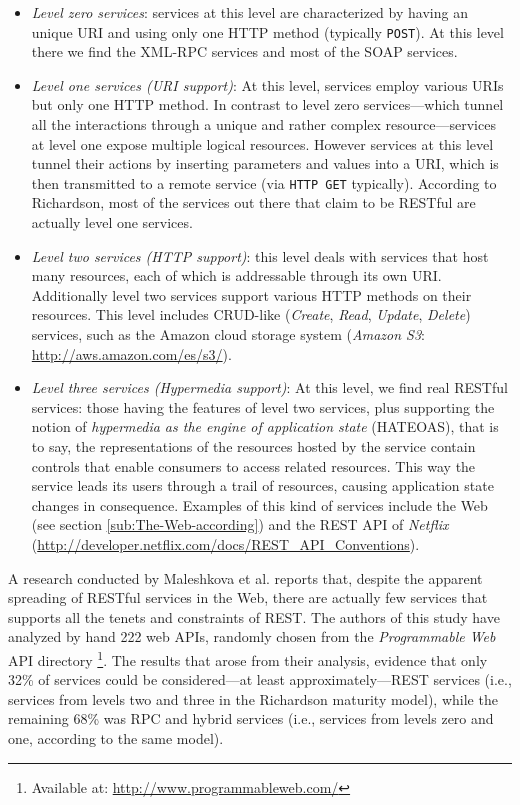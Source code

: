\begin{itemize}
\item \emph{Level zero services}: services at this level are characterized by having an unique URI and using only one HTTP method (typically \texttt{POST}). At this level there we find the XML-RPC services \cite{Laurent:2001} and most of the SOAP services. 
\item \emph{Level one services (URI support)}: At this level, services employ various URIs but only one HTTP method. In contrast to level zero services---which tunnel all the interactions through a unique and rather complex resource---services at level one expose multiple logical resources. However services at this level tunnel their actions by inserting parameters and values into a URI, which is then transmitted to a remote service (via \texttt{HTTP GET} typically). According to Richardson, most of the services out there that claim to be RESTful are actually level one services.
\item \emph{Level two services (HTTP support)}: this level deals with services that host many resources, each of which is addressable through its own URI. Additionally level two services support various HTTP methods on their resources. This level includes CRUD-like (\emph{Create}, \emph{Read}, \emph{Update}, \emph{Delete}) services, such as the Amazon cloud storage system (\emph{Amazon S3}: \href{http://aws.amazon.com/es/s3/} {http://aws.amazon.com/es/s3/}).
\item \emph{Level three services (Hypermedia support)}: At this level, we find real RESTful services: those having the features of level two services, plus supporting the notion of \emph{hypermedia as the engine of application state} (HATEOAS), that is to say, the representations of the resources hosted by the service contain controls that enable consumers to access related resources. This way the service leads its users through a trail of resources, causing application state changes in consequence. Examples of this kind of services include the Web (see section \ref{sub:The-Web-according}) and the REST API of \emph{Netflix} (\href{http://developer.netflix.com/docs/REST_API_Conventions} {http://developer.netflix.com/docs/REST\_{}API\_{}Conventions}). 
\end{itemize}

A research conducted by Maleshkova et al. \cite{Maleshkova:2010} reports that, despite the apparent spreading of RESTful services in the Web, there are actually few services that supports all the tenets and constraints of REST. The authors of this study have analyzed by hand 222 web APIs, randomly chosen from the \emph{Programmable Web }API directory\emph{} \footnote{Available at:\emph{ }\href{http://www.programmableweb.com/}{http://www.programmableweb.com/}}. The results that arose from their analysis, evidence that only 32\% of services could be considered---at least approximately---REST services (i.e., services from levels two and three in the Richardson maturity model), while the remaining 68\% was RPC and hybrid services (i.e., services from levels zero and one, according to the same model).

